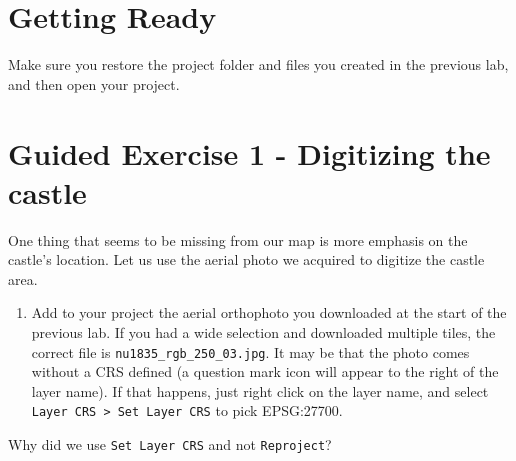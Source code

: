 \documentclass[
  letterpaper,
  DIV=11,
  numbers=noendperiod]{scrreprt}
\providecommand{\tightlist}{%
  \setlength{\itemsep}{0pt}\setlength{\parskip}{0pt}}\usepackage{longtable,booktabs,array}
\begin{document}
\section{Getting Ready}\label{getting-ready}

Make sure you restore the project folder and files you created in the
previous lab, and then open your project.

\section{Guided Exercise 1 - Digitizing the
castle}\label{guided-exercise-1---digitizing-the-castle}

One thing that seems to be missing from our map is more emphasis on the
castle's location. Let us use the aerial photo we acquired to digitize
the castle area.

\begin{enumerate}
\def\labelenumi{(\arabic{enumi})}
\setcounter{enumi}{220}
\tightlist
\item
  Add to your project the aerial orthophoto you downloaded at the start
  of the previous lab. If you had a wide selection and downloaded
  multiple tiles, the correct file is \texttt{nu1835\_rgb\_250\_03.jpg}.
  It may be that the photo comes without a CRS defined (a question mark
  icon will appear to the right of the layer name). If that happens,
  just right click on the layer name, and select
  \texttt{Layer\ CRS\ \textgreater{}\ Set\ Layer\ CRS} to pick
  EPSG:27700.
\end{enumerate}

\begin{tcolorbox}[enhanced jigsaw, coltitle=black, toprule=.15mm, breakable, opacitybacktitle=0.6, left=2mm, colback=white, leftrule=.75mm, rightrule=.15mm, colbacktitle=quarto-callout-important-color!10!white, toptitle=1mm, titlerule=0mm, colframe=quarto-callout-important-color-frame, arc=.35mm, bottomtitle=1mm, opacityback=0, bottomrule=.15mm, title=\textcolor{quarto-callout-important-color}{\faExclamation}\hspace{0.5em}{Stop and Think}]

Why did we use \texttt{Set\ Layer\ CRS} and not \texttt{Reproject}?

\end{tcolorbox}
\end{document}
